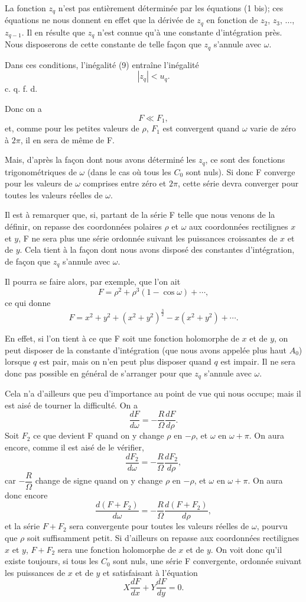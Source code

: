 \documentclass[11pt]{article}
\begin{document}
La fonction $z_q$ n’est pas entièrement déterminée par les équations (1 bis); ces équations ne nous donnent en effet que la dérivée de $z_q$ en fonction de $z_2$, $z_3$, $\ldots$, $z_{q-1}$. Il en résulte que $z_q$ n’est connue qu’à une constante d’intégration près. Nous disposerons de cette constante de telle façon que $z_q$ s’annule avec $\omega$.

Dans ces conditions, l’inégalité (9) entraîne l’inégalité
\[
|z_q|<u_q.
\]
\hfill c. q. f. d.

Donc on a
\[
F\ll F_1,
\]
et, comme pour les petites valeurs de $\rho$, $F_1$ est convergent quand $\omega$ varie de zéro à $2\pi$, il en sera de même de F.

Mais, d’après la façon dont nous avons déterminé les $z_q$, ce sont des fonctions trigonométriques de $\omega$ (dans le cas où tous les $C_0$ sont nuls). Si donc F converge pour les valeurs de $\omega$ comprises entre zéro et $2\pi$, cette série devra converger pour toutes les valeurs réelles de $\omega$.

Il est à remarquer que, si, partant de la série F telle que nous venons de la définir, on repasse des coordonnées polaires $\rho$ et $\omega$ aux coordonnées rectilignes $x$ et $y$, F ne sera plus une série ordonnée suivant les puissances croissantes de $x$ et de $y$. Cela tient à la façon dont nous avons disposé des constantes d’intégration, de façon que $z_q$ s’annule avec $\omega$.

Il pourra se faire alors, par exemple, que l’on ait
\[
F=\rho^2+\rho^3(1-\cos\omega)+\cdots,
\]
ce qui donne
\[
F=x^2+y^2+(x^2+y^2)^{\frac32}-x(x^2+y^2)+\cdots.
\]

En effet, si l’on tient à ce que F soit une fonction holomorphe de $x$ et de $y$, on peut disposer de la constante d’intégration (que nous avons appelée plus haut $A_0$) lorsque $q$ est pair, mais on n’en peut plus disposer quand $q$ est impair. Il ne sera donc pas possible en général de s’arranger pour que $z_q$ s’annule avec $\omega$.

Cela n’a d’ailleurs que peu d’importance au point de vue qui nous occupe; mais il est aisé de tourner la difficulté. On a
\[
\frac{dF}{d\omega}=-\frac{R}{\Omega}\frac{dF}{d\rho}.
\]
Soit $F_2$ ce que devient F quand on y change $\rho$ en $-\rho$, et $\omega$ en $\omega+\pi$. On aura encore, comme il est aisé de le vérifier,
\[
\frac{dF_2}{d\omega}=-\frac{R}{\Omega}\frac{dF_2}{d\rho},
\]
car $-\dfrac{R}{\Omega}$ change de signe quand on y change $\rho$ en $-\rho$, et $\omega$ en $\omega+\pi$. On aura donc encore
\[
\frac{d(F+F_2)}{d\omega}=-\frac{R}{\Omega}\frac{d(F+F_2)}{d\rho},
\]
et la série $F+F_2$ sera convergente pour toutes les valeurs réelles de $\omega$, pourvu que $\rho$ soit suffisamment petit. Si d’ailleurs on repasse aux coordonnées rectilignes $x$ et $y$, $F+F_2$ sera une fonction holomorphe de $x$ et de $y$. On voit donc qu’il existe toujours, si tous les $C_0$ sont nuls, une série F convergente, ordonnée suivant les puissances de $x$ et de $y$ et satisfaisant à l’équation
\[
X\frac{dF}{dx}+Y\frac{dF}{dy}=0.
\]
\end{document}
